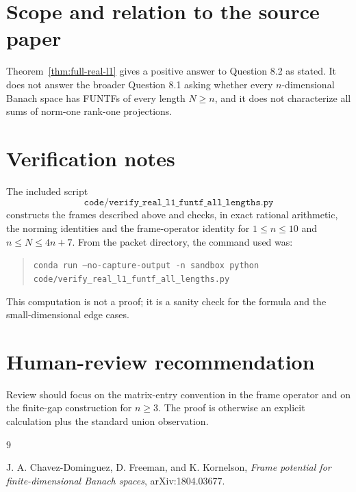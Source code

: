 \documentclass[11pt]{article}
\begin{document}
\section*{Scope and relation to the source paper}

Theorem~\ref{thm:full-real-l1} gives a positive answer to Question 8.2 as
stated. It does not answer the broader Question 8.1 asking whether every
$n$-dimensional Banach space has FUNTFs of every length $N\ge n$, and it
does not characterize all sums of norm-one rank-one projections.

\section*{Verification notes}

The included script
\[
\texttt{code/verify\_real\_l1\_funtf\_all\_lengths.py}
\]
constructs the frames described above and checks, in exact rational
arithmetic, the norming identities and the frame-operator identity for
$1\le n\le 10$ and $n\le N\le 4n+7$. From the packet directory, the command
used was:
\begin{quote}\small
\texttt{conda run --no-capture-output -n sandbox python}\\
\texttt{code/verify\_real\_l1\_funtf\_all\_lengths.py}
\end{quote}
This computation is not a proof; it is a sanity check for the formula and the
small-dimensional edge cases.

\section*{Human-review recommendation}

Review should focus on the matrix-entry convention in the frame operator and
on the finite-gap construction for $n\ge 3$. The proof is otherwise an
explicit calculation plus the standard union observation.

\begin{thebibliography}{9}

J. A. Chavez-Dominguez, D. Freeman, and K. Kornelson,
\emph{Frame potential for finite-dimensional Banach spaces},
arXiv:1804.03677.

\end{thebibliography}
\end{document}
